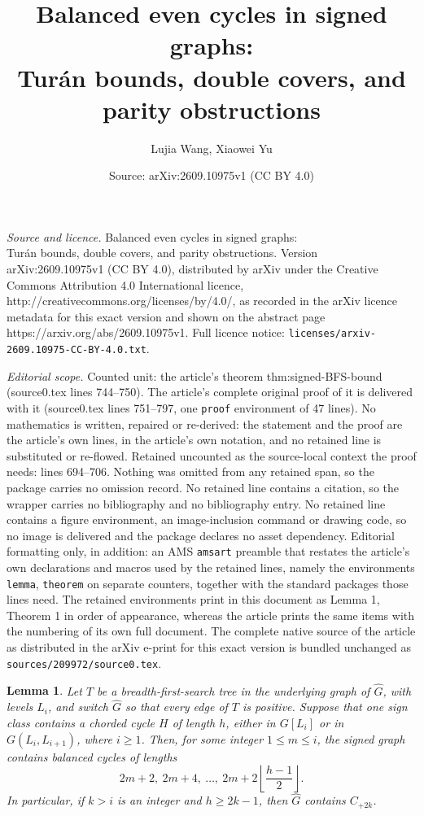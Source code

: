 \documentclass[10pt,a4paper]{amsart}
\title{Balanced even cycles in signed graphs:\\ Tur\'an bounds, double covers, and parity obstructions}
\author{Lujia Wang, Xiaowei Yu}
\date{Source: arXiv:2609.10975v1 (CC BY 4.0)}
\newtheorem{lemma}{Lemma}
\begin{document}
\maketitle

\noindent\emph{Source and licence.} Balanced even cycles in signed graphs:\\ Tur\'an bounds, double covers, and parity obstructions. Version arXiv:2609.10975v1 (CC BY 4.0), distributed by arXiv under the Creative Commons Attribution 4.0 International licence, http://creativecommons.org/licenses/by/4.0/, as recorded in the arXiv licence metadata for this exact version and shown on the abstract page https://arxiv.org/abs/2609.10975v1. Full licence notice: \texttt{licenses/arxiv-2609.10975-CC-BY-4.0.txt}.\par\smallskip

\noindent\textit{Editorial scope.} Counted unit: the article's theorem thm:signed-BFS-bound (source0.tex lines 744--750). The article's complete original proof of it is delivered with it (source0.tex lines 751--797, one \texttt{proof} environment of 47 lines). No mathematics is written, repaired or re-derived: the statement and the proof are the article's own lines, in the article's own notation, and no retained line is substituted or re-flowed.  Retained uncounted as the source-local context the proof needs: lines 694--706.  Nothing was omitted from any retained span, so the package carries no omission record.  No retained line contains a citation, so the wrapper carries no bibliography and no bibliography entry.  No retained line contains a figure environment, an image-inclusion command or drawing code, so no image is delivered and the package declares no asset dependency.  Editorial formatting only, in addition: an AMS \texttt{amsart} preamble that restates the article's own declarations and macros used by the retained lines, namely the environments \texttt{lemma}, \texttt{theorem} on separate counters, together with the standard packages those lines need.  The retained environments print in this document as Lemma 1, Theorem 1 in order of appearance, whereas the article prints the same items with the numbering of its own full document.  The complete native source of the article as distributed in the arXiv e-print for this exact version is bundled unchanged as \texttt{sources/209972/source0.tex}.
\begin{lemma}\label{lem:monochromatic-BFS-closure}
Let $T$ be a breadth-first-search tree in the underlying graph of
$\widehat G$, with levels $L_i$, and switch $\widehat G$ so that every
edge of $T$ is positive.  Suppose that one sign class contains a chorded
cycle $H$ of length $h$, either in $G[L_i]$ or in $G(L_i,L_{i+1})$,
where $i\geq1$.  Then, for some integer $1\leq m\leq i$, the signed
graph contains balanced cycles of lengths
\[
2m+2,\ 2m+4,\ \ldots,\ 2m+2\left\lfloor\frac{h-1}{2}\right\rfloor.
\]
In particular, if $k>i$ is an integer and $h\geq2k-1$, then $\widehat G$ contains
$C_{+2k}$.
\end{lemma}
\end{document}
